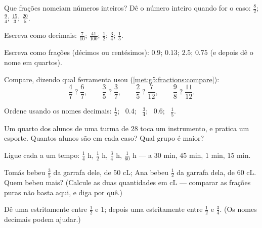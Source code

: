 \begin{exercise}[$\star$]\label{exo:g5:fractions:3}
Que frações nomeiam números inteiros? Dê o número inteiro quando for
o caso: $\frac82$; \quad $\frac{9}{4}$; \quad $\frac{15}{3}$; \quad
$\frac{20}{5}$.
\end{exercise}

\begin{exercise}[$\star$]\label{exo:g5:fractions:4}
Escreva como decimais: $\frac{7}{10}$; \quad $\frac{41}{100}$; \quad
$\frac12$; \quad $\frac34$; \quad $\frac15$.
\end{exercise}

\begin{exercise}[$\star$]\label{exo:g5:fractions:5}
Escreva como frações (décimos ou centésimos): $0.9$; \quad $0.13$;
\quad $2.5$; \quad $0.75$ (e depois dê o nome em quartos).
\end{exercise}

\begin{exercise}[$\star$]\label{exo:g5:fractions:6}
Compare, dizendo qual ferramenta usou
(\cref{met:g5:fractions:compare}):
\[
\frac47 \;?\; \frac67, \qquad
\frac35 \;?\; \frac37, \qquad
\frac25 \;?\; \frac{7}{12}, \qquad
\frac98 \;?\; \frac{11}{12} .
\]
\end{exercise}

\begin{exercise}[$\star$]\label{exo:g5:fractions:7}
Ordene usando os nomes decimais: $\frac12$; \ $0.4$; \ $\frac34$; \
$0.6$; \ $\frac15$.
\end{exercise}

\begin{exercise}[$\star$]\label{exo:g5:fractions:8}
Um quarto dos alunos de uma turma de $28$ toca um instrumento, e
\omterm{def:g3:division:half}{metade} pratica um esporte. Quantos alunos são em cada caso? Qual
grupo é maior?
\end{exercise}

\begin{exercise}[$\star$]\label{exo:g5:fractions:9}
Ligue cada  a um tempo: $\frac14$ h, $\frac12$ h,
$\frac34$ h, $\frac{1}{60}$ h --- a $30$ min, $45$ min, $1$ min,
$15$ min.
\end{exercise}

\begin{exercise}[$\star\star$]\label{exo:g5:fractions:10}
Tomás bebeu $\frac35$ da garrafa dele, de $50$ cL; Ana bebeu
$\frac12$ da garrafa dela, de $60$ cL. Quem bebeu mais? (Calcule as
duas quantidades em cL --- comparar as frações puras não basta aqui,
e diga por quê.)
\end{exercise}

\begin{exercise}[$\star\star$]\label{exo:g5:fractions:11}
Dê uma  estritamente entre $\frac12$ e $1$; depois uma
estritamente entre $\frac12$ e $\frac34$. (Os nomes decimais podem
ajudar.)
\end{exercise}
